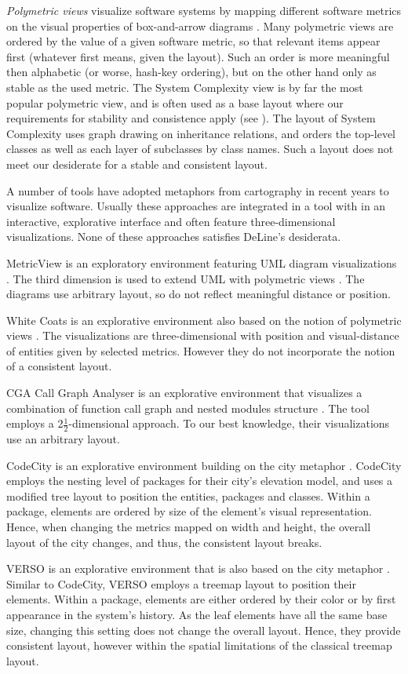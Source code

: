 \emph{Polymetric views} visualize software systems by mapping different software metrics on the visual properties of box-and-arrow diagrams \cite{Lanz03d,Lanz06a}. Many polymetric views are ordered by the 
value of a given software metric, so that relevant items appear first (whatever first means, given the 
layout). Such an order is more meaningful then alphabetic (or worse, hash-key ordering), but on the other hand only as stable as the used metric. The System Complexity view is by far the most popular polymetric view, and is often used as a base layout where our requirements for stability and consistence apply (see \eg \cite{Gree06a}). The layout of System Complexity uses graph drawing on inheritance relations, and orders the top-level classes as well as each layer of subclasses by class names. Such a layout does not meet our desiderate for a stable and consistent layout.
   
A number of tools have adopted metaphors from cartography in recent years to visualize software.
Usually these approaches are integrated in a tool with in an interactive, explorative interface and often feature three-dimensional visualizations. None of these approaches satisfies DeLine's desiderata.

MetricView is an exploratory environment featuring UML diagram visualizations \cite{Term05a}. The third dimension is used to extend UML with polymetric views \cite{Lanz03d}.
The diagrams use arbitrary layout, so do not reflect meaningful distance or position.

White Coats is an explorative environment also based on the notion of polymetric views \cite{Mesn05b}. The visualizations are three-dimensional with position and visual-distance of entities given by selected metrics. However they do not incorporate the notion of a consistent layout.

CGA Call Graph Analyser is an explorative environment that visualizes a combination of function call graph and nested modules structure \cite{Bohn07a}. The tool employs a 2$\frac{1}{2}$-dimensional approach. To our best knowledge, their visualizations use an arbitrary layout.

CodeCity is an explorative environment building on the city metaphor \cite{Wett07b}. CodeCity employs the nesting level of packages for their city's elevation model, and uses a modified tree layout to position the entities, \ie packages and classes. Within a package, elements are ordered by size of the element's visual representation. Hence, when changing the metrics mapped on width and height, the overall layout of the city changes, and thus, the consistent layout breaks.

VERSO is an explorative environment that is also based on the city metaphor \cite{Lang05a}. Similar to CodeCity, VERSO employs a treemap layout to position their elements. Within a package, elements are either ordered by their color or by first appearance in the system's history. As the leaf elements have all the same base size, changing this setting does not change the overall layout. Hence, they provide consistent layout, however within the spatial limitations of the classical treemap layout. 


